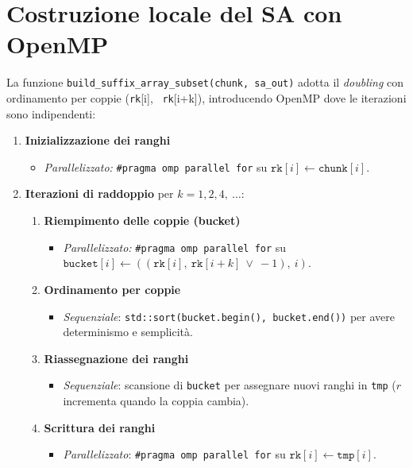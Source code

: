 	\section{Costruzione locale del SA con OpenMP}
		La funzione \texttt{build\_suffix\_array\_subset(chunk, sa\_out)} adotta il \emph{doubling} con ordinamento per coppie (\texttt{rk}[i], \ \texttt{rk}[i+k]), introducendo OpenMP dove le iterazioni sono indipendenti:
		\begin{enumerate}
			\item \textbf{Inizializzazione dei ranghi}
			\begin{itemize}
				\item \emph{Parallelizzato:} \texttt{\#pragma omp parallel for} su \(\texttt{rk}[i] \leftarrow \texttt{chunk}[i]\).
			\end{itemize}
			
			\item \textbf{Iterazioni di raddoppio} per \(k = 1, 2, 4,\ \dots\):
			\begin{enumerate}
				\item \textbf{Riempimento delle coppie (bucket)}
				\begin{itemize}
					\item \emph{Parallelizzato:} \texttt{\#pragma omp parallel for} su \(\texttt{bucket}[i] \leftarrow ((\texttt{rk}[i],\ \texttt{rk}[i+k]\ \lor \ -1),\ i)\).
				\end{itemize}
				
				\item \textbf{Ordinamento per coppie}
				\begin{itemize}
					\item \emph{Sequenziale}: \texttt{std::sort(bucket.begin(), bucket.end())} per avere determinismo e semplicità.
				\end{itemize}
				
				\item \textbf{Riassegnazione dei ranghi}
				\begin{itemize}
					\item \emph{Sequenziale}: scansione di \texttt{bucket} per assegnare nuovi ranghi in \texttt{tmp} (\(r\) incrementa quando la coppia cambia).
				\end{itemize}
				
				\item \textbf{Scrittura dei ranghi}
				\begin{itemize}
					\item \emph{Parallelizzato}: \texttt{\#pragma omp parallel for} su \(\texttt{rk}[i] \leftarrow \texttt{tmp}[i]\).
				\end{itemize}
				

\end{enumerate}
\end{enumerate}
